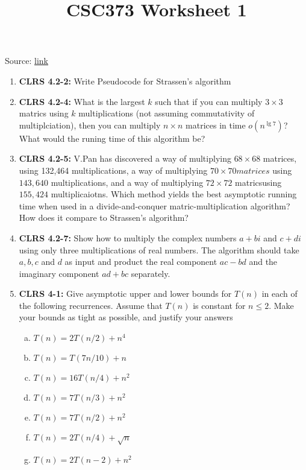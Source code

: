\documentclass[12pt]{article}
\begin{document}
\title{CSC373 Worksheet 1}
\maketitle

\bigskip

Source: \href{http://www.cs.toronto.edu/~denisp/csc373/material.html}{link}

\begin{enumerate}[1.]
    \item \textbf{CLRS 4.2-2:} Write Pseudocode for Strassen's algorithm
    \item \textbf{CLRS 4.2-4:} What is the largest $k$ such that if you can multiply $3 \times 3$ matrics
    using $k$ multiplications (not assuming commutativity of multiplciation), then you can multiply $n \times n$
    matrices in time $o(n^{\lg 7})$? What would the runing time of this algorithm be?
    \item \textbf{CLRS 4.2-5:} V.Pan has discovered a way of multiplying $68 \times 68$ matrices, using 132,464 multiplications,
    a way of multiplying $70 \times 70 matrices$ using $143,640$ multiplications, and a way of
    multiplying $72 \times 72$ matricsusing $155,424$ multiplicaiotns. Which method yields the
    best asymptotic running time when used in a divide-and-conquer matric-multiplication algorithm? How does it
    compare to Strassen's algorithm?
    \item \textbf{CLRS 4.2-7:} Show how to multiply the complex numbers $a + bi$ and $c + di$
    using only three multiplications of real numbers. The algorithm should take $a,b,c$ and $d$ as
    input and product the real component $ac - bd$ and the imaginary component $ad + bc$
    separately.
    \item \textbf{CLRS 4-1:} Give asymptotic upper and lower bounds for $T(n)$ in each of the following
    recurrences. Assume that $T(n)$ is constant for $n \leq 2$. Make your bounds as tight
    as possible, and justify your answers

    \bigskip

    \begin{enumerate}[a)]
        \item $T(n) = 2T(n/2) + n^4$
        \item $T(n) = T(7n/10) + n$
        \item $T(n) = 16T(n/4) + n^2$
        \item $T(n) = 7T(n/3) + n^2$
        \item $T(n) = 7T(n/2) + n^2$
        \item $T(n) = 2T(n/4) + \sqrt{n}$
        \item $T(n) = 2T(n - 2) + n^2$
    \end{enumerate}



\end{enumerate}
\end{document}
